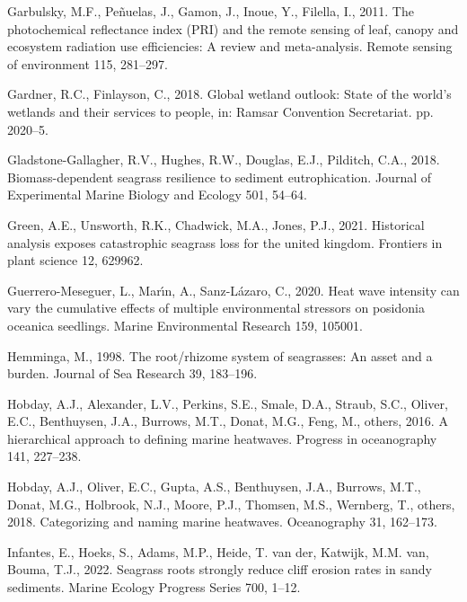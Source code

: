 \documentclass[
  letterpaper,
  DIV=11,
  numbers=noendperiod]{scrartcl}
\newlength{\cslhangindent}
\newenvironment{CSLReferences}[2] %
 {\begin{list}{}{%
  \setlength{\itemindent}{0pt}
  \setlength{\leftmargin}{0pt}
  \setlength{\parsep}{0pt}
  \ifodd #1
   \setlength{\leftmargin}{\cslhangindent}
   \setlength{\itemindent}{-1\cslhangindent}
  \fi
  \setlength{\itemsep}{#2\baselineskip}}}
 {\end{list}}
\begin{document}
\begin{CSLReferences}{1}{0}
Garbulsky, M.F., Peñuelas, J., Gamon, J., Inoue, Y., Filella, I., 2011.
The photochemical reflectance index (PRI) and the remote sensing of
leaf, canopy and ecosystem radiation use efficiencies: A review and
meta-analysis. Remote sensing of environment 115, 281--297.

Gardner, R.C., Finlayson, C., 2018. Global wetland outlook: State of the
world's wetlands and their services to people, in: Ramsar Convention
Secretariat. pp. 2020--5.

Gladstone-Gallagher, R.V., Hughes, R.W., Douglas, E.J., Pilditch, C.A.,
2018. Biomass-dependent seagrass resilience to sediment eutrophication.
Journal of Experimental Marine Biology and Ecology 501, 54--64.

Green, A.E., Unsworth, R.K., Chadwick, M.A., Jones, P.J., 2021.
Historical analysis exposes catastrophic seagrass loss for the united
kingdom. Frontiers in plant science 12, 629962.

Guerrero-Meseguer, L., Marı́n, A., Sanz-Lázaro, C., 2020. Heat wave
intensity can vary the cumulative effects of multiple environmental
stressors on posidonia oceanica seedlings. Marine Environmental Research
159, 105001.

Hemminga, M., 1998. The root/rhizome system of seagrasses: An asset and
a burden. Journal of Sea Research 39, 183--196.

Hobday, A.J., Alexander, L.V., Perkins, S.E., Smale, D.A., Straub, S.C.,
Oliver, E.C., Benthuysen, J.A., Burrows, M.T., Donat, M.G., Feng, M.,
others, 2016. A hierarchical approach to defining marine heatwaves.
Progress in oceanography 141, 227--238.

Hobday, A.J., Oliver, E.C., Gupta, A.S., Benthuysen, J.A., Burrows,
M.T., Donat, M.G., Holbrook, N.J., Moore, P.J., Thomsen, M.S., Wernberg,
T., others, 2018. Categorizing and naming marine heatwaves. Oceanography
31, 162--173.

Infantes, E., Hoeks, S., Adams, M.P., Heide, T. van der, Katwijk, M.M.
van, Bouma, T.J., 2022. Seagrass roots strongly reduce cliff erosion
rates in sandy sediments. Marine Ecology Progress Series 700, 1--12.


\end{CSLReferences}
\end{document}

